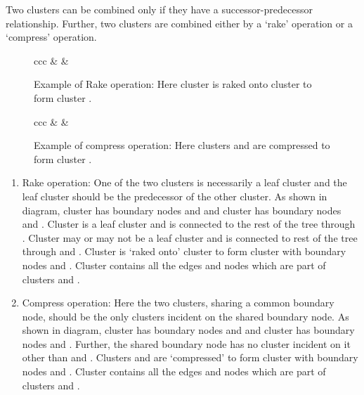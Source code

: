 \documentclass[a4paper,12pt]{article}
\begin{document}
Two clusters can be combined only if they have a successor-predecessor relationship. Further, two clusters are combined either by a `rake' operation or a `compress' operation.
\begin{figure}
\begin{tabular}{ccc}
&
&
\end{tabular}
\caption{Example of Rake operation: Here cluster  is raked onto cluster  to form cluster .}
\label{fig:rake-example}
\end{figure}
\begin{figure}
\begin{tabular}{ccc}
&
&
\end{tabular}
\caption{Example of compress operation: Here clusters  and  are compressed to form cluster .}
\label{fig:compress-example}
\end{figure}

\begin{enumerate}
\item Rake operation: One of the two clusters is necessarily a leaf cluster and the leaf cluster should be the predecessor of the other cluster. As shown in diagram, cluster  has boundary nodes  and  and cluster  has boundary nodes  and . Cluster  is a leaf cluster and is connected to the rest of the tree through . Cluster  may or may not be a leaf cluster and is connected to rest of the tree through  and . Cluster  is `raked onto' cluster  to form cluster  with boundary nodes  and . Cluster  contains all the edges and nodes which are part of clusters  and .\\


\item Compress operation: Here the two clusters, sharing a common boundary node, should be the only clusters incident on the shared boundary node. As shown in diagram, cluster  has boundary nodes  and  and cluster  has boundary nodes  and . Further, the shared boundary node  has no cluster incident on it other than  and . Clusters  and  are `compressed' to form cluster  with boundary nodes  and . Cluster  contains all the edges and nodes which are part of clusters  and .\\
\end{enumerate}
\end{document}
